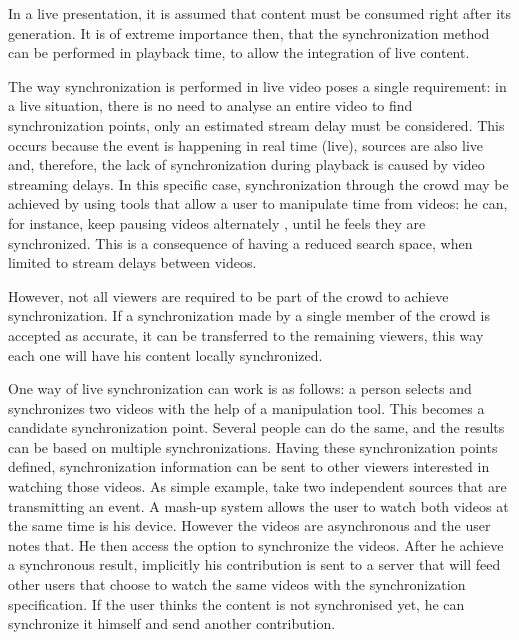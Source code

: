 In a live presentation, it is assumed that content must be consumed right after its generation. It is of extreme importance then, that the synchronization method can be performed in playback time, to allow the integration of live content.

The way synchronization is performed in live video poses a single requirement: in a live situation, there is no need to analyse an entire video to find synchronization points, only an estimated stream delay must be considered. This occurs because the event is happening in real time (live), sources are also live and, therefore, the lack of synchronization during playback is caused by video streaming delays. In this specific case, synchronization through the crowd may be achieved by using tools that allow a user to manipulate time from videos: he can, for instance, keep pausing videos alternately , until he feels they are synchronized. This is a consequence of having a reduced search space, when limited to stream delays between videos.

However, not all viewers are required to be part of the crowd to achieve synchronization. If a synchronization made by a single member of the crowd is accepted as accurate, it can be transferred to the remaining viewers, this way each one will have his content locally synchronized.

One way of live synchronization can work is as follows: a person selects and synchronizes two videos with the help of a manipulation tool. This becomes a candidate synchronization point. Several people can do the same, and the results can be based on multiple synchronizations. Having these synchronization points defined, synchronization information can be sent to other viewers interested in watching those videos. As simple example, take two independent sources that are transmitting an event. A mash-up system allows the user to watch both videos at the same time is his device. However the videos are asynchronous and the user notes that. He then access the option to synchronize the videos. After he achieve a synchronous result, implicitly his contribution is sent to a server that will feed other users that choose to watch the same videos with the synchronization specification. If the user thinks the content is not synchronised yet, he can synchronize it himself and send another contribution.